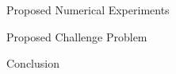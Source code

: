 \documentclass{beamer}
\begin{document}
\begin{frame}{Proposed Numerical Experiments}

\end{frame}

\begin{frame}{Proposed Challenge Problem}

\end{frame}

\begin{frame}{Conclusion}

\end{frame}

\end{document}
